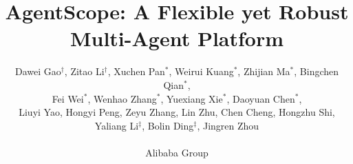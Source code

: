 \documentclass[english]{article}
\begin{document}
\title{AgentScope: A Flexible yet Robust Multi-Agent Platform}

\author{
Dawei Gao$^\dagger$, 
Zitao Li$^\dagger$,
Xuchen Pan$^*$,
Weirui Kuang$^*$,
Zhijian Ma$^*$,
Bingchen Qian$^*$,
\\
Fei Wei$^*$,
Wenhao Zhang$^*$,
Yuexiang Xie$^*$,
Daoyuan Chen$^*$, 
\\
Liuyi Yao,
Hongyi Peng,
Zeyu Zhang,
Lin Zhu,
Chen Cheng,
Hongzhu Shi,
\\
Yaliang Li$^\ddagger$, 
Bolin Ding$^\ddagger$, 
Jingren Zhou
\\
\\
\small{Alibaba Group}
}

\renewcommand{\thefootnote}{\fnsymbol{footnote}}

\date{}

\maketitle















\clearpage


\clearpage


\end{document}
